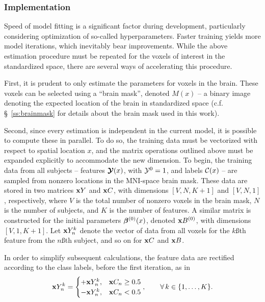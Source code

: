 \subsubsection{Implementation}
Speed of model fitting is a significant factor during development, particularly considering optimization of so-called hyperparameters. Faster training yields more model iterations, which inevitably bear improvements. While the above estimation procedure must be repeated for the voxels of interest in the standardized space, there are several ways of accelerating this procedure.
\par
First, it is prudent to only estimate the parameters for voxels in the brain. These voxels can be selected using a ``brain mask'', denoted $M(x)$ -- a binary image denoting the expected location of the brain in standardized space (c.f. \S\ \ref{ss:brainmask} for details about the brain mask used in this work).
\par
Second, since every estimation is independent in the current model, it is possible to compute these in parallel. To do so, the training data must be vectorized with respect to spatial location $x$, and the matrix operations outlined above must be expanded explicitly to accommodate the new dimension. To begin, the training data from all subjects -- features $\bm{\mathcal{Y}}(x)$, with $\mathcal{Y}^0=1$, and labels $\mathcal{C}(x)$ -- are sampled from nonzero locations in the MNI-space brain mask. These data are stored in two matrices $\mathbf{x}{Y}$ and $\mathbf{x}{C}$, with dimensions $[V,N,K+1]$ and $[V,N,1]$, respectively, where $V$ is the total number of nonzero voxels in the brain mask, $N$ is the number of subjects, and $K$ is the number of features. A similar matrix is constructed for the initial parameters $\bm{\beta}^{(0)}(x)$, denoted $\mathbf{x}{B}^{(0)}$, with dimensions $[V,1,K+1]$. Let $\mathbf{x}{Y}_n^k$ denote the vector of data from all voxels for the $k$\ss{th} feature from the $n$\ss{th} subject, and so on for $\mathbf{x}{C}$ and $\mathbf{x}{B}$.
\par
In order to simplify subsequent calculations, the feature data are rectified according to the class labels, before the first iteration, as in
\begin{equation}
\mathbf{x}{Y}_n^k =
\begin{cases}
+\mathbf{x}{Y}_n^k, & \mathbf{x}{C}_n \ge 0.5\\
-\mathbf{x}{Y}_n^k, & \mathbf{x}{C}_n <  0.5\\
\end{cases},\qquad\forall\thinspace k \in \{1,\dots,K\}.
\end{equation}
